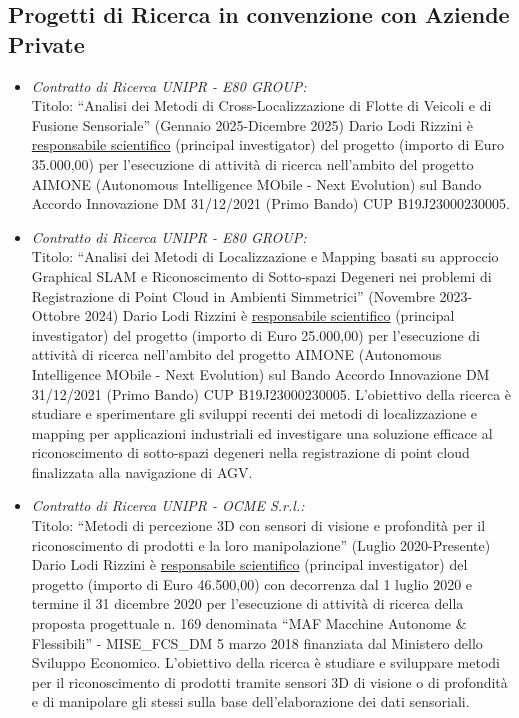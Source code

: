 \documentclass[11pt]{article}
\newcommand{\ITEMDATE}[1]{\item \textit{#1:}\\}
\begin{document}
\begin{itemize}
\section*{Progetti di Ricerca in convenzione con Aziende Private}

\begin{itemize}

\ITEMDATE{Contratto di Ricerca UNIPR - E80 GROUP} 
Titolo: ``Analisi dei Metodi di Cross-Localizzazione di Flotte di Veicoli e di Fusione Sensoriale'' (Gennaio 2025-Dicembre 2025)
Dario Lodi Rizzini \`e \underline{responsabile scientifico} (principal investigator) del progetto (importo di Euro 35.000,00) per l'esecuzione di attivit\`a di ricerca nell'ambito del progetto AIMONE (Autonomous Intelligence MObile - Next Evolution) sul Bando Accordo Innovazione DM 31/12/2021 (Primo Bando) CUP B19J23000230005. 

\ITEMDATE{Contratto di Ricerca UNIPR - E80 GROUP} 
Titolo: ``Analisi dei Metodi di Localizzazione e Mapping basati su approccio Graphical SLAM e Riconoscimento di Sotto-spazi Degeneri nei problemi di Registrazione di Point Cloud in Ambienti Simmetrici'' (Novembre 2023-Ottobre 2024)
Dario Lodi Rizzini \`e \underline{responsabile scientifico} (principal investigator) del progetto (importo di Euro 25.000,00) per l'esecuzione di attivit\`a di ricerca nell'ambito del progetto AIMONE (Autonomous Intelligence MObile - Next Evolution) sul Bando Accordo Innovazione DM 31/12/2021 (Primo Bando) CUP B19J23000230005. 
L'obiettivo della ricerca \`e studiare e sperimentare gli sviluppi recenti dei metodi di localizzazione e mapping per applicazioni industriali ed investigare una soluzione efficace al riconoscimento di sotto-spazi degeneri nella registrazione di point cloud finalizzata alla navigazione di AGV.

\ITEMDATE{Contratto di Ricerca UNIPR - OCME S.r.l.} 
Titolo: ``Metodi di percezione 3D con sensori di visione e profondit\`a per il riconoscimento di prodotti e la loro manipolazione'' (Luglio 2020-Presente)
Dario Lodi Rizzini \`e \underline{responsabile scientifico} (principal investigator) del progetto (importo di Euro 46.500,00) con decorrenza dal 1 luglio 2020 e termine 
il 31 dicembre 2020 per l'esecuzione di attivit\`a di ricerca della proposta progettuale n. 169 denominata ``MAF Macchine Autonome \& Flessibili'' - MISE\_FCS\_DM 5 marzo 2018 finanziata dal Ministero dello Sviluppo Economico. 
L'obiettivo della ricerca \`e studiare e sviluppare metodi per il riconoscimento di prodotti tramite sensori 3D di visione o di profondit\`a e di manipolare gli stessi sulla base dell’elaborazione dei dati sensoriali. 


\end{itemize}
\end{itemize}
\end{document}
